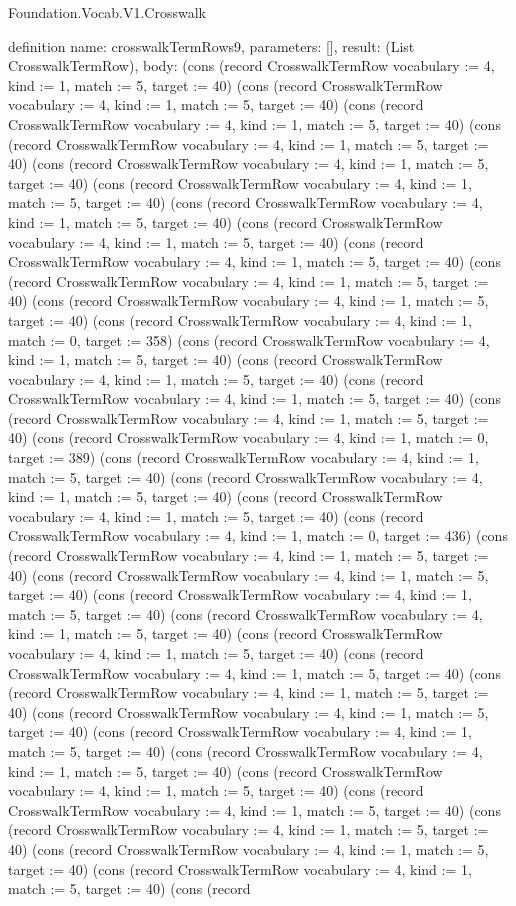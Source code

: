 \begin{lexlean}{Foundation.Vocab.V1.Crosswalk}
\begin{semanticmodule}
definition{
  name: crosswalkTermRows9,
  parameters: [],
  result: (List CrosswalkTermRow),
  body: (cons (record CrosswalkTermRow {vocabulary := 4, kind := 1, match := 5, target := 40}) (cons (record CrosswalkTermRow {vocabulary := 4, kind := 1, match := 5, target := 40}) (cons (record CrosswalkTermRow {vocabulary := 4, kind := 1, match := 5, target := 40}) (cons (record CrosswalkTermRow {vocabulary := 4, kind := 1, match := 5, target := 40}) (cons (record CrosswalkTermRow {vocabulary := 4, kind := 1, match := 5, target := 40}) (cons (record CrosswalkTermRow {vocabulary := 4, kind := 1, match := 5, target := 40}) (cons (record CrosswalkTermRow {vocabulary := 4, kind := 1, match := 5, target := 40}) (cons (record CrosswalkTermRow {vocabulary := 4, kind := 1, match := 5, target := 40}) (cons (record CrosswalkTermRow {vocabulary := 4, kind := 1, match := 5, target := 40}) (cons (record CrosswalkTermRow {vocabulary := 4, kind := 1, match := 5, target := 40}) (cons (record CrosswalkTermRow {vocabulary := 4, kind := 1, match := 5, target := 40}) (cons (record CrosswalkTermRow {vocabulary := 4, kind := 1, match := 0, target := 358}) (cons (record CrosswalkTermRow {vocabulary := 4, kind := 1, match := 5, target := 40}) (cons (record CrosswalkTermRow {vocabulary := 4, kind := 1, match := 5, target := 40}) (cons (record CrosswalkTermRow {vocabulary := 4, kind := 1, match := 5, target := 40}) (cons (record CrosswalkTermRow {vocabulary := 4, kind := 1, match := 5, target := 40}) (cons (record CrosswalkTermRow {vocabulary := 4, kind := 1, match := 0, target := 389}) (cons (record CrosswalkTermRow {vocabulary := 4, kind := 1, match := 5, target := 40}) (cons (record CrosswalkTermRow {vocabulary := 4, kind := 1, match := 5, target := 40}) (cons (record CrosswalkTermRow {vocabulary := 4, kind := 1, match := 5, target := 40}) (cons (record CrosswalkTermRow {vocabulary := 4, kind := 1, match := 0, target := 436}) (cons (record CrosswalkTermRow {vocabulary := 4, kind := 1, match := 5, target := 40}) (cons (record CrosswalkTermRow {vocabulary := 4, kind := 1, match := 5, target := 40}) (cons (record CrosswalkTermRow {vocabulary := 4, kind := 1, match := 5, target := 40}) (cons (record CrosswalkTermRow {vocabulary := 4, kind := 1, match := 5, target := 40}) (cons (record CrosswalkTermRow {vocabulary := 4, kind := 1, match := 5, target := 40}) (cons (record CrosswalkTermRow {vocabulary := 4, kind := 1, match := 5, target := 40}) (cons (record CrosswalkTermRow {vocabulary := 4, kind := 1, match := 5, target := 40}) (cons (record CrosswalkTermRow {vocabulary := 4, kind := 1, match := 5, target := 40}) (cons (record CrosswalkTermRow {vocabulary := 4, kind := 1, match := 5, target := 40}) (cons (record CrosswalkTermRow {vocabulary := 4, kind := 1, match := 5, target := 40}) (cons (record CrosswalkTermRow {vocabulary := 4, kind := 1, match := 5, target := 40}) (cons (record CrosswalkTermRow {vocabulary := 4, kind := 1, match := 5, target := 40}) (cons (record CrosswalkTermRow {vocabulary := 4, kind := 1, match := 5, target := 40}) (cons (record CrosswalkTermRow {vocabulary := 4, kind := 1, match := 5, target := 40}) (cons (record CrosswalkTermRow {vocabulary := 4, kind := 1, match := 5, target := 40}) (cons (record }
\end{semanticmodule}
\end{lexlean}
